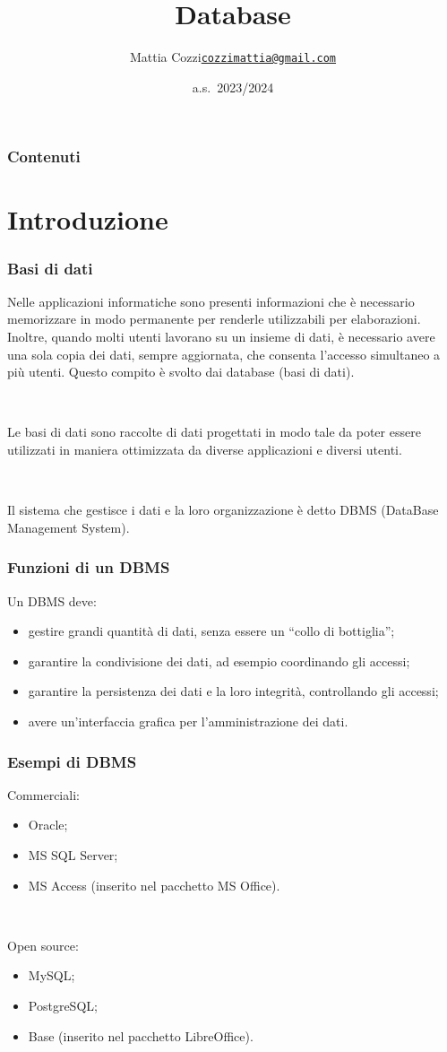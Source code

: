 \documentclass[]{beamer}
\title{Database}
\author{Mattia Cozzi\newline\href{mailto:cozzimattia@gmail.com}{\texttt{cozzimattia@gmail.com}}}
\date{a.s.~2023/2024}
\begin{document}
\begin{frame}
  \titlepage
\end{frame}


\begin{frame}
\frametitle{Contenuti}
\tableofcontents
\end{frame}



\section{Introduzione}


\begin{frame}
\frametitle{Basi di dati}
Nelle applicazioni informatiche sono presenti informazioni che è necessario memorizzare in modo permanente per renderle utilizzabili per elaborazioni. Inoltre, quando molti utenti lavorano su un insieme di dati, è necessario avere una sola copia dei dati, sempre aggiornata, che consenta l'accesso simultaneo a più utenti. Questo compito è svolto dai \alert<1>{database} (basi di dati). 

~

Le \alert<2>{basi di dati} sono raccolte di dati progettati in modo tale da poter essere utilizzati in maniera ottimizzata da diverse applicazioni e diversi utenti.\pause

~

Il sistema che gestisce i dati e la loro organizzazione è detto \alert<3>{DBMS} (DataBase Management System).
\end{frame}


\begin{frame}
\frametitle{Funzioni di un DBMS}
Un DBMS deve:
\begin{itemize}
  \item gestire grandi quantità di dati, senza essere un ``collo di bottiglia'';\pause
  \item garantire la condivisione dei dati, ad esempio coordinando gli accessi;\pause
  \item garantire la persistenza dei dati e la loro integrità, controllando gli accessi;\pause
  \item avere un'interfaccia grafica per l'amministrazione dei dati.
\end{itemize}
\end{frame}


\begin{frame}
\frametitle{Esempi di DBMS}
Commerciali:
\begin{itemize}
  \item Oracle;
  \item MS SQL Server;
  \item MS Access (inserito nel pacchetto MS Office).
\end{itemize}\pause

~

Open source:
\begin{itemize}
  \item MySQL;
  \item PostgreSQL;
  \item Base (inserito nel pacchetto LibreOffice).
\end{itemize}
\end{frame}
\end{document}
